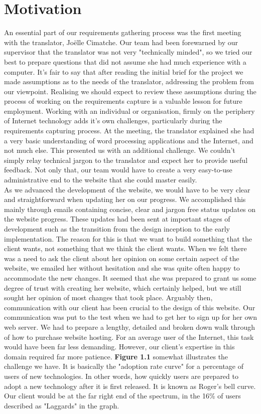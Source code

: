 \documentclass{l3proj}
\begin{document}
\section{Motivation}
An essential part of our requirements gathering process was the first meeting
with the translator, Jo\"{e}lle Cimatche. Our team had been forewarned by our
supervisor that the translator was not very "technically minded", so we tried
our best to prepare questions that did not assume she had much experience with a
computer. It's fair to say that after reading the initial brief for the project
we made assumptions as to the needs of the translator, addressing the problem
from our viewpoint. Realising we should expect to review these assumptions
during the process of working on the requirements capture is a valuable lesson
for future employment. Working with an individual or organisation, firmly on the
periphery of Internet technology adds it's own challenges, particularly during
the requirements capturing process. At the meeting, the translator explained she
had a very basic understanding of word processing applications and the Internet,
and not much else. This presented us with an additional challenge. We couldn't
simply relay technical jargon to the translator and expect her to provide useful
feedback. Not only that, our team would have to create a very easy-to-use administrative
end to the website that she could master easily.\\
As we advanced the development of the website, we would have to be very clear
and straightforward when updating her on our progress. We accomplished this
mainly through emails containing concise, clear and jargon free status updates
on the website progress. These updates had been sent at important stages of
development such as the transition from the design inception to the early
implementation. The reason for this is that we want to build something that the
client wants, not something that we think the client wants. When we felt there
was a need to ask the client about her opinion on some certain aspect of the
website, we emailed her without hesitation and she was quite often happy to
accommodate the new changes. It seemed that she was prepared to grant us some
degree of trust with creating her website, which certainly helped, but we still
sought her opinion of most changes that took place. Arguably then, communication
with our client has been crucial to the design of this website. Our
communication was put to the test when we had to get her to sign up for her own
web server. We had to prepare a lengthy, detailed and broken down walk through
of how to purchase website hosting. For an average user of the Internet, this
task would have been far less demanding. However, our client's expertise in this
domain required far more patience. \textbf{Figure 1.1} somewhat illustrates the
challenge we have. It is basically the "adoption rate curve" for a percentage of
users of new technologies. In other words, how quickly users are prepared to
adopt a new technology after it is first released. It is known as Roger's bell
curve. Our client would be at the far right end of the spectrum, in the 16\% of
users described as "Laggards" in the graph.\\
	
\end{document}
